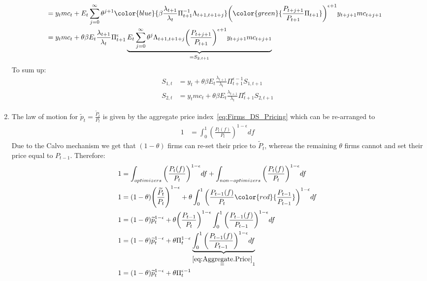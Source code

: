 \begin{enumerate}
\begin{align*}
	\\
	&= y_t mc_t + E_t\sum^{\infty}_{j=0}\theta^{j+1} {\color{blue}{\beta \frac{\lambda_{t+1}}{\lambda_t}\Pi_{t+1}^{-1}\Lambda_{t+1,t+1+j}}} {\left({\color{green}{\frac{P_{t+j+1}}{P_{t+1}}\Pi_{t+1}}}\right)}^{\epsilon+1} y_{t+j+1} mc_{t+j+1}
	\\
	&= y_t mc_t + 
	\theta\beta E_t\frac{\lambda_{t+1}}{\lambda_t}\Pi_{t+1}^{\epsilon} \underbrace{E_t\sum^{\infty}_{j=0}\theta^{j} \Lambda_{t+1,t+1+j} {\left(\frac{P_{t+j+1}}{P_{t+1}}\right)}^{\epsilon+1} y_{t+j+1} mc_{t+j+1}}_{=S_{2,t+1}}
	\end{align*}
To sum up:
\begin{align}
	S_{1,t} &= y_t + \theta \beta E_t \frac{\lambda_{t+1}}{\lambda_{t}} \Pi_{t+1}^{\epsilon-1} S_{1,t+1}\\
	S_{2,t} &= y_t mc_t + \theta \beta E_t \frac{\lambda_{t+1}}{\lambda_{t}} \Pi_{t+1}^{\epsilon} S_{2,t+1}
\end{align}
\item The law of motion for \(\widetilde{p}_t=\frac{\widetilde{P}_t}{P_t}\) is given by the aggregate price index~\eqref{eq:Firms_DS_Pricing} which can be re-arranged to
\begin{align}
	1 &= \int_{0}^{1} {\left(\frac{P_t(f)}{P_t}\right)}^{1-\epsilon}df \label{eq:Aggregate.Price}
\end{align}
Due to the Calvo mechanism we get that \((1-\theta)\) firms can re-set their price to \(\widetilde{P}_t\),
  whereas the remaining \(\theta \) firms cannot and set their price equal to \(P_{t-1}\).
Therefore:
\begin{align}
	1 &= \int_{optimizers} {\left(\frac{P_t(f)}{P_t}\right)}^{1-\epsilon} df  + \int_{non-optimizers} {\left(\frac{P_t(f)}{P_t}\right)}^{1-\epsilon} df \\
	1&= (1-\theta) {\left(\frac{\widetilde{P}_t}{P_t}\right)}^{1-\epsilon} + \theta \int_{0}^1 {\left(\frac{P_{t-1}(f)}{P_t}{\color{red}{\frac{P_{t-1}}{P_{t-1}}}}\right)}^{1-\epsilon}df\\
	1&= (1-\theta) \widetilde{p}_t^{1-\epsilon} + \theta {\left(\frac{P_{t-1}}{P_{t}}\right)}^{1-\epsilon} \int_{0}^1 {\left(\frac{P_{t-1}(f)}{P_{t-1}}\right)}^{1-\epsilon}df\\
	1&=(1-\theta) \widetilde{p}_t^{1-\epsilon}  + \theta \Pi_t^{1-\epsilon} \underbrace{\int_{0}^{1} {\left(\frac{P_{t-1}(f)}{P_{t-1}} \right)}^{1-\epsilon}df}_{\overset{\eqref{eq:Aggregate.Price}}{=}1}\\
	1&=(1-\theta) \widetilde{p}_t^{1-\epsilon}  + \theta \Pi_t^{\epsilon-1}
\end{align}
	

\end{enumerate}
